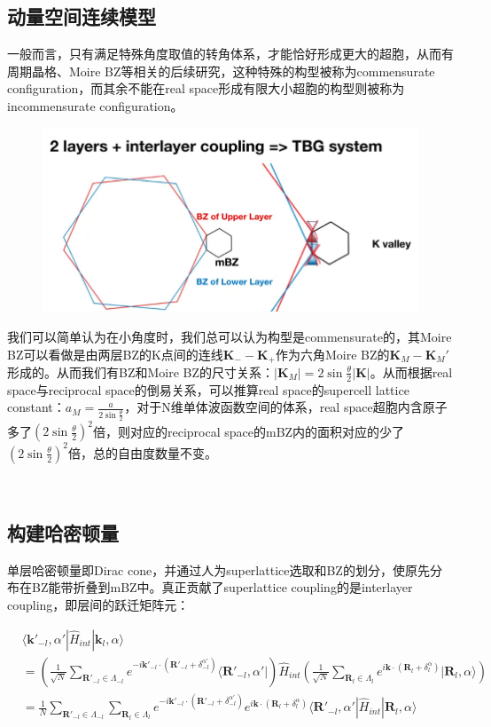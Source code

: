 \documentclass[hyperref,a4paper,UTF8]{ctexart}
\begin{document}
\subsection{动量空间连续模型}
一般而言，只有满足特殊角度取值的转角体系，才能恰好形成更大的超胞，从而有周期晶格、Moire BZ等相关的后续研究，这种特殊的构型被称为commensurate configuration，而其余不能在real space形成有限大小超胞的构型则被称为incommensurate configuration。
\begin{figure}[h]
	\centering
	\includegraphics[scale=0.6]{figures/layer.png}
\end{figure}

我们可以简单认为在小角度时，我们总可以认为构型是commensurate的，其Moire BZ可以看做是由两层BZ的K点间的连线$\mathbf{K}_- - \mathbf{K}_+$作为六角Moire BZ的$\mathbf{K}_M - \mathbf{K}_M'$形成的。从而我们有BZ和Moire BZ的尺寸关系：$|\mathbf{K}_M| = 2 \sin \frac{\theta}{2} |\mathbf{K}|$。从而根据real space与reciprocal space的倒易关系，可以推算real space的supercell lattice constant：$a_M = \frac{a}{2 \sin \frac{\theta}{2}}$，对于N维单体波函数空间的体系，real space超胞内含原子多了$(2 \sin \frac{\theta}{2})^2$倍，则对应的reciprocal space的mBZ内的面积对应的少了$(2 \sin \frac{\theta}{2})^2$倍，总的自由度数量不变。

\
\subsection{构建哈密顿量}
单层哈密顿量即Dirac cone，并通过人为superlattice选取和BZ的划分，使原先分布在BZ能带折叠到mBZ中。真正贡献了superlattice coupling的是interlayer coupling，即层间的跃迁矩阵元：

$$\begin{aligned} & \langle \mathbf{k}'_{-l}, \alpha' | \hat{H}_{int} | \mathbf{k}_{l}, \alpha \rangle \\ & = \left( \frac{1}{\sqrt{N}}\sum_{\mathbf{R}'_{-l} \in \Lambda_{-l}} e^{-i \mathbf{k}'_{-l} \cdot (\mathbf{R}'_{-l} + \delta^{\alpha'}_{-l})} \langle \mathbf{R}'_{-l}, \alpha' | \right) \hat{H}_{int} \left( \frac{1}{\sqrt{N}}\sum_{\mathbf{R}_l \in \Lambda_l} e^{i \mathbf{k} \cdot (\mathbf{R}_l + \delta^\alpha_l)} | \mathbf{R}_l, \alpha \rangle \right) \\ & = \frac{1}{N} \sum_{\mathbf{R}'_{-l} \in \Lambda_{-l}} \sum_{\mathbf{R}_l \in \Lambda_l} e^{-i \mathbf{k}'_{-l} \cdot (\mathbf{R}'_{-l} + \delta^{\alpha'}_{-l})} e^{i \mathbf{k} \cdot (\mathbf{R}_l + \delta^\alpha_l)} \langle \mathbf{R}'_{-l}, \alpha' |\hat{H}_{int} | \mathbf{R}_l, \alpha \rangle \end{aligned}$$
\end{document}
